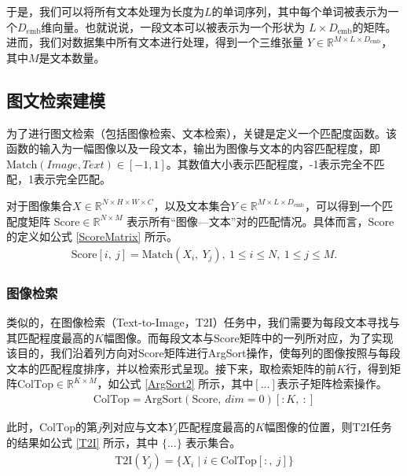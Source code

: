 \documentclass[a4paper]{zreport}
\begin{document}
于是，我们可以将所有文本处理为长度为$L$的单词序列，其中每个单词被表示为一个$D_\mathrm{emb}$维向量。也就说说，一段文本可以被表示为一个形状为 $L \times D_\mathrm{emb}$的矩阵。进而，我们对数据集中所有文本进行处理，得到一个三维张量 $Y \in \mathbb{R}^{M \times L \times D_\mathrm{emb}}$，其中$M$是文本数量。

\subsection{图文检索建模}

为了进行图文检索（包括图像检索、文本检索），关键是定义一个匹配度函数。该函数的输入为一幅图像以及一段文本，输出为图像与文本的内容匹配程度，即$\mathrm{Match}\left(Image, Text\right) \in \left[-1, 1\right]$。其数值大小表示匹配程度，-1表示完全不匹配，1表示完全匹配。

对于图像集合$X \in \mathbb{R}^{N \times H \times W \times C}$，以及文本集合$Y \in \mathbb{R}^{M \times L \times D_\mathrm{emb}}$，可以得到一个匹配度矩阵 $\mathrm{Score} \in \mathbb{R}^{N \times M}$ 表示所有“图像—文本”对的匹配情况。具体而言，$\mathrm{Score}$的定义如公式 \eqref{ScoreMatrix} 所示。
\begin{gather}
\mathrm{Score}\left[i,~j\right] = \mathrm{Match}\left(X_i,~Y_j\right),~1\le i \le N,~1\le j \le M.\label{ScoreMatrix}
\end{gather}


\subsubsection{图像检索}

类似的，在图像检索（Text-to-Image，T2I）任务中，我们需要为每段文本寻找与其匹配程度最高的$K$幅图像。而每段文本与$\mathrm{Score}$矩阵中的一列所对应，为了实现该目的，我们沿着列方向对$\mathrm{Score}$矩阵进行ArgSort操作，使每列的图像按照与每段文本的匹配程度排序，并以检索形式呈现。接下来，取检索矩阵的前$K$行，得到矩阵$\mathrm{ColTop} \in \mathbb{R}^{K \times M}$，如公式 \eqref{ArgSort2} 所示，其中$\left[...\right]$表示子矩阵检索操作。
\begin{gather}
\mathrm{ColTop} = \mathrm{ArgSort}\left(\mathrm{Score},~dim=0\right)\left[:K,~:\right]
\label{ArgSort2}
\end{gather}

此时，$\mathrm{ColTop}$的第$j$列对应与文本$Y_j$匹配程度最高的$K$幅图像的位置，则T2I任务的结果如公式 \eqref{T2I} 所示，其中 $\{...\}$ 表示集合。
\begin{gather}
\mathrm{T2I}\left(Y_j\right) = \{X_i\mid i \in \mathrm{ColTop}\left[:,~j\right]\}\label{T2I}
\end{gather}
\end{document}
